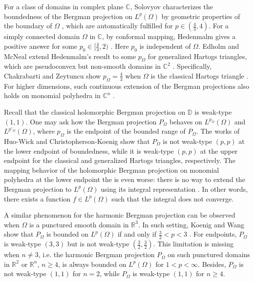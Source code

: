 \documentclass[12pt]{amsart}
\theoremstyle{definition}
\theoremstyle{remark}
\newcommand{\R}{\mathbb{R}}
\newcommand{\D}{\mathbb{D}}
\newcommand{\C}{\mathbb{C}}
\begin{document}
For a class of domains in complex plane $\C$, Solovyov characterizes the boundedness of the Bergman projection on $L^p(\Omega)$ by geometric properties of the boundary of $\Omega$ \cite{S1,S2}, which are automatically fulfilled for $p\in(\frac{4}{3},4)$.
For a simply connected domain $\Omega$ in $\C$, by conformal mapping, Hedenmalm gives a positive answer for some $p_0\in[\frac{4}{3},2)$ \cite{H}.
Here $p_0$ is independent of $\Omega$.
Edholm and McNeal extend Hedenmalm's result to some $p_\Omega$ for generalized Hartogs triangles, which are pseudoconvex but non-smooth domains in $\C^2$ \cite{EM1,EM2}.
Specifically, Chakrabarti and Zeytuncu show $p_\Omega=\frac{4}{3}$ when $\Omega$ is the classical Hartogs triangle \cite{CZ}.
For higher dimensions, such continuous extension of the Bergman projections also holds on monomial polyhedra in $\C^n$ \cite{BCEM}.

Recall that the classical holomorphic Bergman projection on $\D$ is weak-type $(1,1)$.
One may ask how the Bergman projection $P_\Omega$ behaves on $L^{p_\Omega}(\Omega)$ and $L^{p'_\Omega}(\Omega)$, where $p_\Omega$ is the endpoint of the bounded range of $P_\Omega$.
The works of Huo-Wick \cite{HW} and Christopherson-Koenig \cite{CK1,CK2,CK3} show that $P_\Omega$ is not weak-type $(p,p)$ at the lower endpoint of boundedness, while it is weak-type $(p,p)$ at the upper endpoint for the classical and generalized Hartogs triangles, respectively.
The mapping behavior of the holomorphic Bergman projection on monomial polyhedra at the lower endpoint the is even worse: there is no way to extend the Bergman projection to $L^p(\Omega)$ using its integral representation \cite[Proposition 8.1]{CE}.
In other words, there exists a function $f\in L^p(\Omega)$ such that the integral does not converge.

A similar phenomenon for the harmonic Bergman projection can be observed when $\Omega$ is a punctured smooth domain in $\R^3$.
In such setting, Koenig and Wang show that $P_\Omega$ is bounded on $L^p(\Omega)$ if and only if $\frac{3}{2}<p<3$ \cite{KW}.
For endpoints, $P_\Omega$ is weak-type $(3,3)$ but is not weak-type $(\frac{3}{2},\frac{3}{2})$.
This limitation is missing when $n\neq3$, i.e. the harmonic Bergman projection $P_\Omega$ on such punctured domains in $\R^2$ or $\R^n$, $n\geqslant4$, is always bounded on $L^p(\Omega)$ for $1<p<\infty$.
Besides, $P_\Omega$ is not weak-type $(1,1)$ for $n=2$, while $P_\Omega$ is weak-type $(1,1)$ for $n\geqslant4$.
\end{document}
